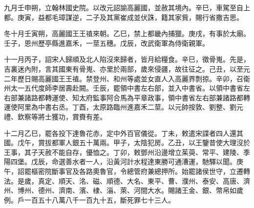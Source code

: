 \begin{pinyinscope}
 九月壬申朔，立翰林國史院。以改元詔諭高麗國，並赦其境內。辛巳，車駕至自上都。庚寅，益都毛璋謀逆，二子及其黨崔成並伏誅，籍其家貲，賜行省撒吉思。



 冬十月壬寅朔，高麗國王王禃來朝。乙巳，禁上都畿內捕獵。庚戌，有事於太廟。壬子，恩州歷亭縣進嘉禾，一莖五穗。戊辰，改武衛軍為侍衛親軍。



 十一月丙子，詔宋人歸順及北人陷沒來歸者，皆月給糧食。辛巳，徵骨嵬。先是，吉裏迷內附，言其國東有骨嵬、亦里於兩部，歲來侵疆，故往征之。己丑，以至元二年歷日賜高麗國王王禃。禁登州、和州等處並女直人入高麗界剽掠。辛卯，召衛州太一五代度師李居壽赴闕。壬辰，罷領中書左右部，並入中書省。以領中書省左右部兼諸路都轉運使、知太府監事阿合馬為平章政事，領中書省左右部兼諸路都轉運使阿里為中書右丞。丁酉，太原路臨州進嘉禾二莖。以元帥按敦、劉整、劉元禮、欽察等將士獲功，賞賚有差。



 十二月乙巳，罷各投下達魯花赤，定中外百官儀從。丁未，敕遣宋諜者四人還其國。戊午，賞拔都軍人銀五十萬兩。甲子，太陰犯房。乙丑，以王鑒昔使大理沒於王事，其子天赦不能自存，優恤之。丁卯，敕鄧州沿邊增立茱萸、常平、建陵、季陽四堡。戊辰，命選善水者一人，沿黃河計水程達東勝可通漕運，馳驛以聞。庚午，詔罷樞密院斷事官及各路奧魯官，令總管府兼總押所。始罷諸侯世守，立遷轉法。是歲，真定、順天、洺、磁、順德、大名、東平、曹、濮州、泰安、高唐、濟州、博州、德州、濟南、濱、棣、淄、萊、河間大水。賜諸王金、銀、幣帛如歲例。戶一百五十八萬八千一百九十五，斷死罪七十三人。



\end{pinyinscope}